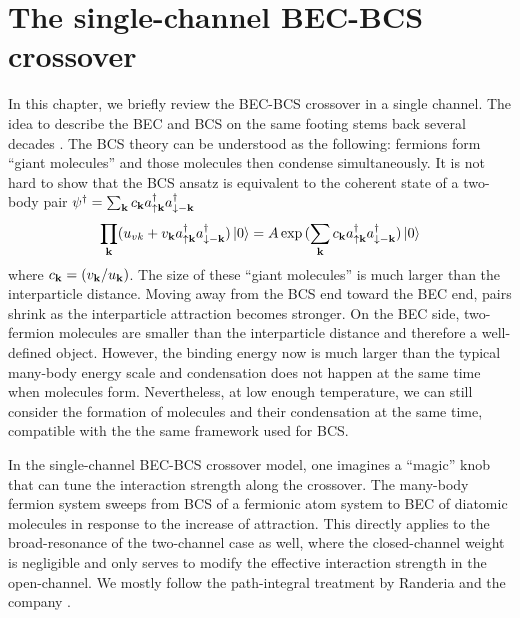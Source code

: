 \chapter{The single-channel BEC-BCS crossover\label{sec:intro:1channel}}
In this chapter, we briefly review the BEC-BCS crossover in a single channel.   The idea to describe the BEC and BCS on the same footing stems back several decades \cite{Eagle, LeggettCrossover, Nozieres, RanderiaBEC}.  %
The BCS theory can be understood as the following: fermions form  ``giant molecules'' and those molecules then condense simultaneously.    It is not hard to show that the  BCS ansatz is equivalent to  the  coherent state of a two-body pair $\psi^{\dagger}=\sum_{\mathbf{k}}c_{\mathbf{k}}a^{\dagger}_{\uparrow\mathbf{k}}a^{\dagger}_{\downarrow-\mathbf{k}}$
\begin{equation}\label{eq:intro:BCScoherent}
\prod_{\mathbf{k}}(u_{vk}+v_{\mathbf{k}}a^{\dagger}_{\uparrow\mathbf{k}}a^{\dagger}_{\downarrow-\mathbf{k}})\left|0\right>=A\exp{}(\sum_{\mathbf{k}}c_{\mathbf{k}}a^{\dagger}_{\uparrow\mathbf{k}}a^{\dagger}_{\downarrow-\mathbf{k}})\left|0\right>
\end{equation}
where $c_{\mathbf{k}}=( v_{\mathbf{k}}/u_{\mathbf{k}})$. The size of these ``giant molecules'' is  much larger than the interparticle distance.
Moving away from the BCS end toward the BEC end, pairs shrink as the interparticle attraction becomes stronger.  On the BEC side, two-fermion molecules are smaller than the interparticle distance and therefore a well-defined object. However, the binding energy now is much larger than the typical many-body energy scale and condensation does not happen at the same time when molecules form.  Nevertheless,  at low enough temperature, we can still consider the formation of molecules and their condensation  at the same time, compatible with the  the same framework used for BCS.  

In the single-channel BEC-BCS crossover model, one imagines a ``magic'' knob that can tune the interaction strength along the crossover.  The many-body fermion  system sweeps from  BCS of a fermionic atom system to BEC of diatomic molecules  in response to the increase of attraction.   This directly applies to the broad-resonance of the two-channel case as well, where the closed-channel weight is negligible and only serves  to modify the effective interaction strength in the open-channel.  We mostly follow the path-integral treatment by Randeria and the company \cite{RanderiaBEC, Randeria1997, Randeria2008}.




\begin{subappendices}
\end{subappendices}

